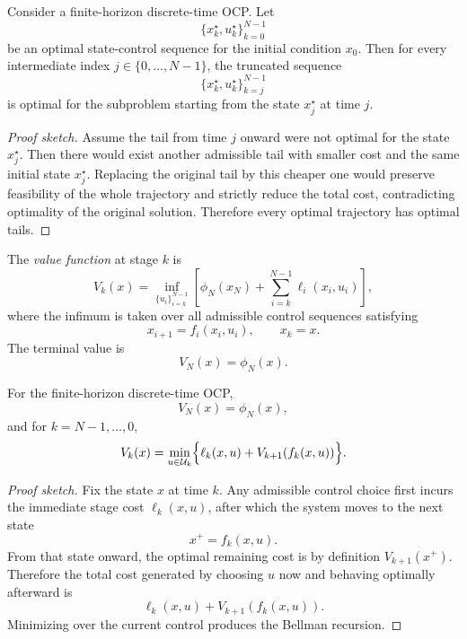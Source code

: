 \begin{theorem}\label{thm:l4-bellman-s-principle-of-optimality}
	Consider a finite-horizon discrete-time OCP. Let
	\[
		\{x_k^\star,u_k^\star\}_{k=0}^{N-1}
	\]
	be an optimal state-control sequence for the initial condition $x_0$. Then for every intermediate index $j \in \{0,\dots,N-1\}$, the truncated sequence
	\[
		\{x_k^\star,u_k^\star\}_{k=j}^{N-1}
	\]
	is optimal for the subproblem starting from the state $x_j^\star$ at time $j$.
\end{theorem}
\begin{proof}[Proof sketch]
	Assume the tail from time $j$ onward were not optimal for the state $x_j^\star$. Then there would exist another admissible tail with smaller cost and the same initial state $x_j^\star$. Replacing the original tail by this cheaper one would preserve feasibility of the whole trajectory and strictly reduce the total cost, contradicting optimality of the original solution. Therefore every optimal trajectory has optimal tails.
\end{proof}

\begin{definition}\label{def:l4-value-function}
	The \emph{value function} at stage $k$ is
	\[
		V_k(x)=
		\inf_{\{u_i\}_{i=k}^{N-1}}
		\left[
		\phi_N(x_N)+\sum_{i=k}^{N-1}\ell_i(x_i,u_i)
		\right],
	\]
	where the infimum is taken over all admissible control sequences satisfying
	\[
		x_{i+1}=f_i(x_i,u_i),
		\qquad
		x_k=x.
	\]
	The terminal value is
	\[
		V_N(x)=\phi_N(x).
	\]
\end{definition}

\begin{theorem}\label{thm:l4-bellman-equation}
	For the finite-horizon discrete-time OCP,
	\[
		V_N(x)=\phi_N(x),
	\]
	and for $k=N-1,\dots,0$,
	\[
		V_k(x)=\min_{u \in \mathcal{U}_k}\Bigl\{\ell_k(x,u)+V_{k+1}(f_k(x,u))\Bigr\}.
	\]
\end{theorem}
\begin{proof}[Proof sketch]
	Fix the state $x$ at time $k$. Any admissible control choice first incurs the immediate stage cost $\ell_k(x,u)$, after which the system moves to the next state
	\[
		x^+=f_k(x,u).
	\]
	From that state onward, the optimal remaining cost is by definition $V_{k+1}(x^+)$. Therefore the total cost generated by choosing $u$ now and behaving optimally afterward is
	\[
		\ell_k(x,u)+V_{k+1}(f_k(x,u)).
	\]
	Minimizing over the current control produces the Bellman recursion.
\end{proof}

